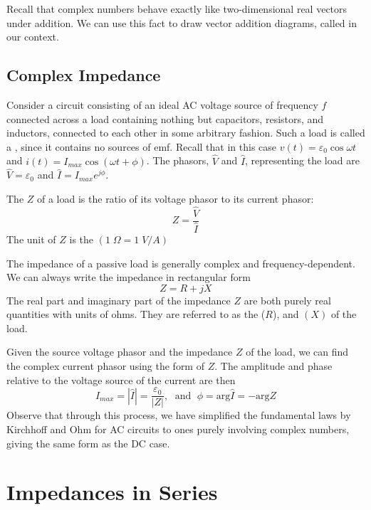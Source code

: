 Recall that complex numbers behave exactly like two-dimensional real vectors under addition. We can use this fact to draw vector addition diagrams, called  in our context.


\section{Complex Impedance}

Consider a circuit consisting of an ideal AC voltage source of frequency $f$ connected across a load containing nothing but capacitors, resistors, and inductors, connected to each other in some arbitrary fashion. Such a load is called a , since it contains no sources of emf. Recall that in this case $v(t) = \varepsilon_0 \cos\omega t$ and $i(t) = I_{max}\cos(\omega t+\phi)$. The phasors, $\hat{V}$ and $\hat{I}$, representing the load are $\hat{V} = \varepsilon_0$ and $\hat{I} = I_{max}e^{j\phi}$. 

\begin{defn}
    The  $Z$ of a load is the ratio of its voltage phasor to its current phasor: $$Z = \frac{\hat{V}}{\hat{I}}$$ The unit of $Z$ is the  $(1\;\Omega = 1\;V/A)$ 
\end{defn}
The impedance of a passive load is generally complex and frequency-dependent. We can always write the impedance in rectangular form $$Z = R + jX$$ The real part and imaginary part of the impedance $Z$ are both purely real quantities with units of ohms. They are referred to as the  ($R$), and  $(X)$ of the load. 

Given the source voltage phasor and the impedance $Z$ of the load, we can find the complex current phasor using the form of $Z$. The amplitude and phase relative to the voltage source of the current are then $$I_{max} = |\hat{I}| = \frac{\varepsilon_0}{|Z|},\;\text{ and }\;\phi = \text{arg}\hat{I} = -\text{arg}Z$$ Observe that through this process, we have simplified the fundamental laws by Kirchhoff and Ohm for AC circuits to ones purely involving complex numbers, giving the same form as the DC case.






\chapter{Impedances in Series}

